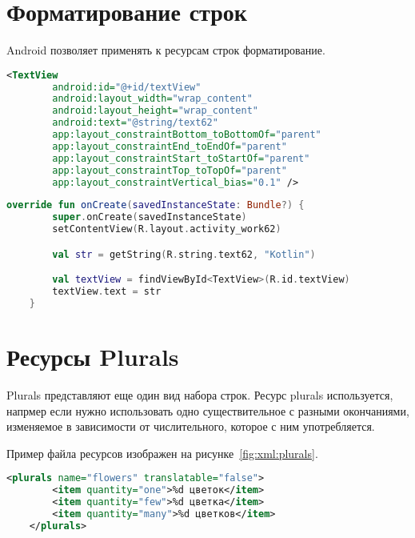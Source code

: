 
\section{Форматирование строк}
Android позволяет применять к ресурсам строк форматирование.

\begin{lstlisting}[language=xml, caption=\leftline{Форматная строка в каталоге ресурсов}, label=lst:xml:format]
<TextView
        android:id="@+id/textView"
        android:layout_width="wrap_content"
        android:layout_height="wrap_content"
        android:text="@string/text62"
        app:layout_constraintBottom_toBottomOf="parent"
        app:layout_constraintEnd_toEndOf="parent"
        app:layout_constraintStart_toStartOf="parent"
        app:layout_constraintTop_toTopOf="parent"
        app:layout_constraintVertical_bias="0.1" />
\end{lstlisting}

\begin{lstlisting}[language=Kotlin, caption=\leftline{Форматная строка в каталоге ресурсов}, label=lst:kot:format]
override fun onCreate(savedInstanceState: Bundle?) {
        super.onCreate(savedInstanceState)
        setContentView(R.layout.activity_work62)

        val str = getString(R.string.text62, "Kotlin")

        val textView = findViewById<TextView>(R.id.textView)
        textView.text = str
    }
\end{lstlisting}


\section{Ресурсы Plurals}
Plurals представляют еще один вид набора строк.
Ресурс plurals используется, напрмер если нужно использовать одно
существительное с разными окончаниями, изменяемое в зависимости от
числительного, которое с ним употребляется.\par
Пример файла ресурсов изображен на рисунке~\ref{fig:xml:plurals}.

\begin{lstlisting}[language=xml, caption=\leftline{Объявление ресурсов Plurals}, label=lst:xml:plurals]
<plurals name="flowers" translatable="false">
        <item quantity="one">%d цветок</item>
        <item quantity="few">%d цветка</item>
        <item quantity="many">%d цветков</item>
    </plurals>
\end{lstlisting}


